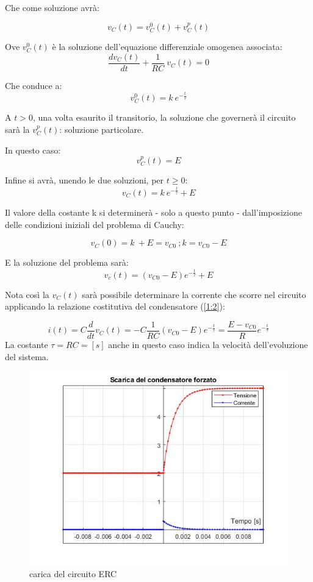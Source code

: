 \documentclass[a4paper, 12pt, twoside]{report}
\begin{document}
{Che come soluzione avrà:

\begin{equation}
v_C\left(t\right)=v_C^0\left(t\right)+v_C^p\left(t\right)
\end{equation}

Ove $v_C^0\left(t\right)$ è la soluzione dell’equazione differenziale omogenea associata:
\[
\frac{dv_C\left(t\right)}{dt}+\frac{1}{RC}\ v_C\left(t\right)=0
\]

Che conduce a:
\[
v_C^0\left(t\right)=k\ e^{-\frac{t}{\tau}}
\]

A $t>0$, una volta esaurito il transitorio, la soluzione che governerà il circuito sarà la $v_C^p\left(t\right)$: soluzione particolare. 

In questo caso:
\[
v_C^p\left(t\right)=E
\]

Infine si avrà, unendo le due soluzioni, per $t\ge0$:
\begin{equation}
v_C\left(t\right)=k\ e^{-\frac{t}{\tau}}+E
\end{equation}

Il valore della costante k si determinerà - solo a questo punto - dall’imposizione delle condizioni iniziali del problema di Cauchy:

\[
v_C\left(0\right)=k\ +E=v_{C0}\ ;k=v_{C0}-E
\]

E la soluzione del problema sarà:
\begin{equation}
v_c\left(t\right)=\left(v_{C0}-E\right)e^{-\frac{t}{\tau}}+E
\end{equation}

Nota così la $v_C\left(t\right)$ sarà possibile determinare la corrente che scorre nel circuito applicando la relazione costitutiva del condensatore (\ref{1:2}):

\begin{equation}
i\left(t\right)=C\frac{d}{dt}v_C\left(t\right)=-C\frac{1}{RC}\left(v_{C0}-E\right)e^{-\frac{t}{\tau}}=\frac{E-v_{C0}}{R}e^{-\frac{t}{\tau}}
\end{equation}
La costante $\tau=RC=[s]$ anche in questo caso indica la velocità dell’evoluzione del sistema.

\begin{figure}[H]
	\centering
	\includegraphics[width=1\linewidth]{Carica&Scarica/plotScaricaERCfig}
	\caption{carica del circuito ERC}
	\label{fig:PLOTERC}
\end{figure}
\newpage
}
\end{document}
